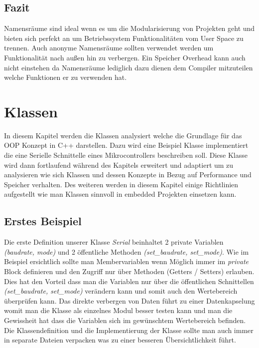 \documentclass[MES,Master,ngerman]{twbook}%
\begin{document}
\subsection{Fazit}
Namensräume sind ideal wenn es um die Modularisierung von Projekten geht und bieten sich perfekt an um Betriebssystem Funktionalitäten vom User Space zu trennen. Auch anonyme Namensräume sollten verwendet werden um Funktionalität nach außen hin zu verbergen. Ein Speicher Overhead kann auch nicht einstehen da Namensräume lediglich dazu dienen dem Compiler mitzuteilen welche Funktionen er zu verwenden hat.
\newpage

\section{Klassen}
In diesem Kapitel werden die Klassen analysiert welche die Grundlage für das OOP Konzept in C++ darstellen. Dazu wird eine Beispiel Klasse implementiert die eine Serielle Schnittelle eines Mikrocontrollers beschreiben soll. Diese Klasse wird dann fortlaufend während des Kapitels erweitert und adaptiert um zu analysieren wie sich Klassen und dessen Konzepte in Bezug auf Performance und Speicher verhalten. Des weiteren werden in diesem Kapitel einige Richtlinien aufgestellt wie man Klassen sinnvoll in embedded Projekten einsetzen kann. 
\subsection{Erstes Beispiel}
Die erste Definition unserer Klasse \textit{Serial} beinhaltet 2 private Variablen \textit{(baudrate, mode)} und 2 öffentliche Methoden \textit{(set\_baudrate, set\_mode)}. Wie im Beispiel ersichtlich sollte man Membervariablen wenn Möglich immer im \textit{private} Block definieren und den Zugriff nur über Methoden (Getters / Setters) erlauben. Dies hat den Vorteil dass man die Variablen nur über die öffentlichen Schnittellen \textit{(set\_baudrate, set\_mode)} verändern kann und somit auch den Wertebereich überprüfen kann. Das direkte verbergen von Daten führt zu einer Datenkapselung womit man die Klasse als einzelnes Modul besser testen kann und man die Gewissheit hat dass die Variablen sich im gewünschtem Wertebereich befinden. Die Klassendefinition und die Implementierung der Klasse sollte man auch immer in separate Dateien verpacken was zu einer besseren Übersichtlichkeit führt. \newline 
\begin{figure}[!htb]
	\begin{subfigure}[b]{0.5\textwidth}
		
		\label{fig:19}
	\end{subfigure}
	\begin{subfigure}[b]{0.5\textwidth}
		
		\label{fig:20}
	\end{subfigure}
\end{figure}
\end{document}
